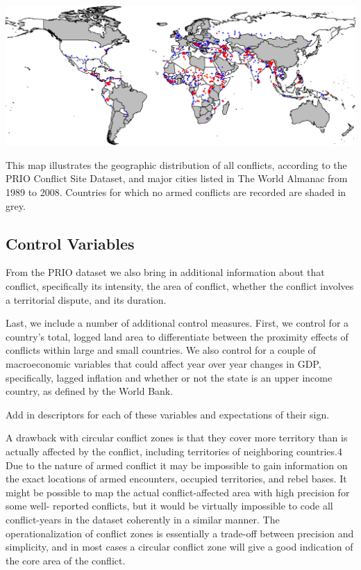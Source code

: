 \begin{amssidewaysfigure}
	\centering
	\includegraphics[width=1\textwidth]{CityConfMap-crop}
	\caption{This map illustrates the geographic distribution of all conflicts, according to the PRIO Conflict Site Dataset, and major cities listed in The World Almanac from 1989 to 2008. Countries for which no armed conflicts are recorded are shaded in grey.}
	\label{fig:CityConfMap}
\end{amssidewaysfigure}
\FloatBarrier

\subsection{Control Variables}

From the PRIO dataset we also bring in additional information about that conflict, specifically its intensity, the area of conflict, whether the conflict involves a territorial dispute, and its duration.

Last, we include a number of additional control measures. First, we control for a country's total, logged land area to differentiate between the proximity effects of conflicts within large and small countries. We also control for a couple of macroeconomic variables that could affect year over year changes in GDP, specifically, lagged inflation and whether or not the state is an upper income country, as defined by the World Bank.

Add in descriptors for each of these variables and expectations of their sign.

A drawback with circular conflict zones is that they cover more territory than is actually affected by the conflict, including territories of neighboring countries.4 Due to the nature of armed conflict it may be impossible to gain information on the exact locations of armed encounters, occupied territories, and rebel bases. It might be possible to map the actual conflict-affected area with high precision for some well- reported conflicts, but it would be virtually impossible to code all conflict-years in the dataset coherently in a similar manner. The operationalization of conflict zones is essentially a trade-off between precision and simplicity, and in most cases a circular conflict zone will give a good indication of the core area of the conflict.

